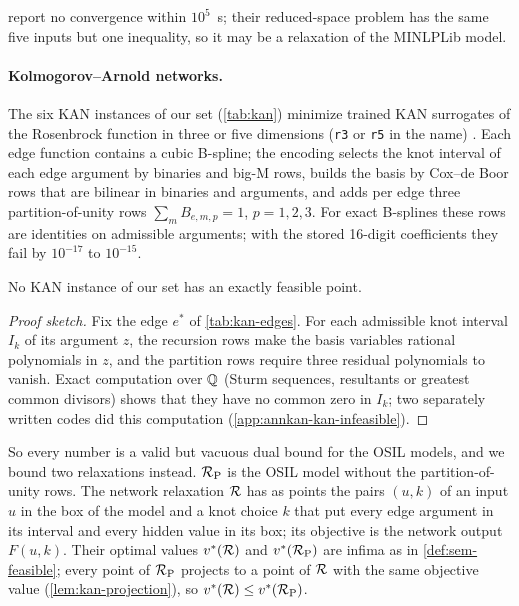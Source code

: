 report no convergence within $10^5$~s; their reduced-space problem has the same five inputs but one inequality, so it may be a relaxation of the MINLPLib model.

\paragraph{Kolmogorov--Arnold networks.}
The six KAN instances of our set (\cref{tab:kan}) minimize trained KAN surrogates of the Rosenbrock function in three or five dimensions (\texttt{r3} or \texttt{r5} in the name) \citep{liu2024-kan-kolmogorov-arnold-networks,karia2025-deterministic-global-optimization-over-trained}.
Each edge function contains a cubic B-spline; the encoding selects the knot interval of each edge argument by binaries and big-M rows, builds the basis by Cox--de Boor rows that are bilinear in binaries and arguments, and adds per edge three partition-of-unity rows $\sum_mB_{e,m,p}=1$, $p=1,2,3$.
For exact B-splines these rows are identities on admissible arguments; with the stored 16-digit coefficients they fail by $10^{-17}$ to $10^{-15}$.

\begin{proposition}[infeasibility]\label{prop:kan-infeasible}
No KAN instance of our set has an exactly feasible point.
\end{proposition}

\begin{proof}[Proof sketch]
Fix the edge $e^*$ of \cref{tab:kan-edges}.
For each admissible knot interval $I_k$ of its argument $z$, the recursion rows make the basis variables rational polynomials in $z$, and the partition rows require three residual polynomials to vanish.
Exact computation over $\mathbb{Q}$ (Sturm sequences, resultants or greatest common divisors) shows that they have no common zero in $I_k$; two separately written codes did this computation (\cref{app:annkan-kan-infeasible}).
\end{proof}

So every number is a valid but vacuous dual bound for the OSIL models, and we bound two relaxations instead.
$\mathcal{R}_{\mathrm{P}}$ is the OSIL model without the partition-of-unity rows.
The network relaxation $\mathcal{R}$ has as points the pairs $(u,k)$ of an input $u$ in the box of the model and a knot choice $k$ that put every edge argument in its interval and every hidden value in its box; its objective is the network output $F(u,k)$.
Their optimal values $v^{*}(\mathcal{R})$ and $v^{*}(\mathcal{R}_{\mathrm{P}})$ are infima as in \cref{def:sem-feasible}; every point of $\mathcal{R}_{\mathrm{P}}$ projects to a point of $\mathcal{R}$ with the same objective value (\cref{lem:kan-projection}), so $v^{*}(\mathcal{R})\le v^{*}(\mathcal{R}_{\mathrm{P}})$.


